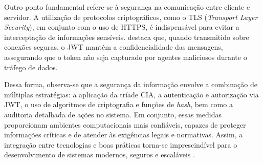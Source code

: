 Outro ponto fundamental refere-se à segurança na comunicação entre cliente e servidor. A utilização de protocolos criptográficos, como o TLS (\textit{Transport Layer Security}), em conjunto com o uso de HTTPS, é indispensável para evitar a interceptação de informações sensíveis. \textcite{RFC8446} destaca que, quando transmitido sobre conexões seguras, o JWT mantém a confidencialidade das mensagens, assegurando que o token não seja capturado por agentes maliciosos durante o tráfego de dados.

Dessa forma, observa-se que a segurança da informação envolve a combinação de múltiplas estratégias: a aplicação da tríade CIA, a autenticação e autorização via JWT, o uso de algoritmos de criptografia e funções de \textit{hash}, bem como a auditoria detalhada de ações no sistema. Em conjunto, essas medidas proporcionam ambientes computacionais mais confiáveis, capazes de proteger informações críticas e de atender às exigências legais e normativas. Assim, a integração entre tecnologias e boas práticas torna-se imprescindível para o desenvolvimento de sistemas modernos, seguros e escaláveis \parencite{Fontes2008,Anderson2021,HoldsworthKosinski2024,JonesBradleySakimura2015,JWTIO2024,Bradley2020,IBM2021,Schneier2015,PressmanMaxim2021,RFC8446}.

















